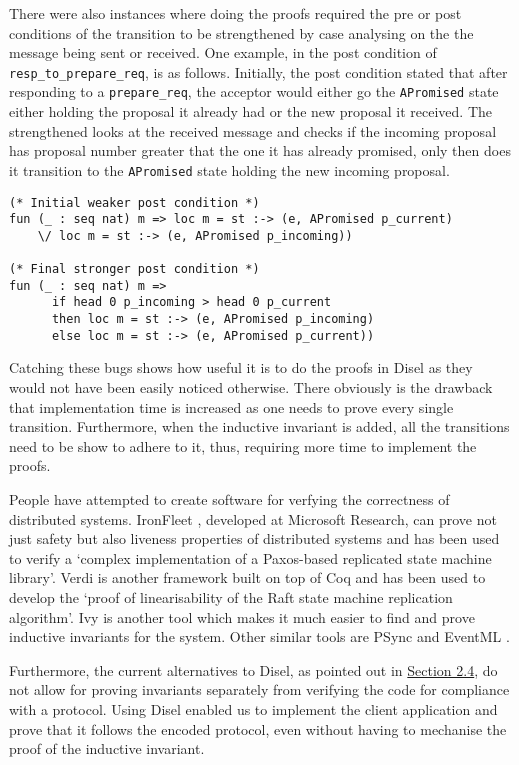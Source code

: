 There were also instances where doing the proofs required the pre
or post conditions of the transition to
be strengthened by case analysing on the the message being sent or received.
One example, in the post condition of \texttt{resp\_to\_prepare\_req}, is as follows. Initially,
the post condition stated that after responding to a \texttt{prepare\_req},
the acceptor would either go the \texttt{APromised} state either holding the
proposal it already had or the new proposal it received. The strengthened
looks at the received message and checks if the incoming proposal has proposal
number greater that the one it has already promised, only then does it transition
to the \texttt{APromised} state holding the new incoming proposal.

\begin{lstlisting}
(* Initial weaker post condition *)
fun (_ : seq nat) m => loc m = st :-> (e, APromised p_current)
    \/ loc m = st :-> (e, APromised p_incoming))

(* Final stronger post condition *)
fun (_ : seq nat) m =>
      if head 0 p_incoming > head 0 p_current
      then loc m = st :-> (e, APromised p_incoming)
      else loc m = st :-> (e, APromised p_current))
\end{lstlisting}

Catching these bugs shows how useful it is to do the proofs in Disel as they
would not have been easily noticed otherwise.
There obviously is the drawback that implementation time is increased as one
needs to prove every single transition. Furthermore, when the inductive
invariant is added, all the transitions need to be show to adhere to it,
thus, requiring more time to implement the proofs.

People have attempted to create software for verfying the correctness of distributed
systems. IronFleet \cite{15}, developed at Microsoft Research, can prove not just
safety but also liveness properties of distributed systems and has been used
to verify a `complex implementation of a Paxos-based replicated state machine
library'. Verdi \cite{16} is another framework built on top of Coq and has been used
to develop the `proof of linearisability of the Raft state machine replication
algorithm'. Ivy \cite{19} is another tool which makes it much easier to find and
prove inductive invariants for the system. Other similar tools are PSync \cite{17}
and EventML \cite{18}.

Furthermore, the current alternatives to Disel, as pointed out in
\hyperref[sec:relatedWork]{Section 2.4}, do not allow for proving invariants
separately from verifying the code for compliance with a protocol. Using
Disel enabled us to implement the client application and prove that it
follows the encoded protocol, even without having to mechanise the proof of the
inductive invariant.


